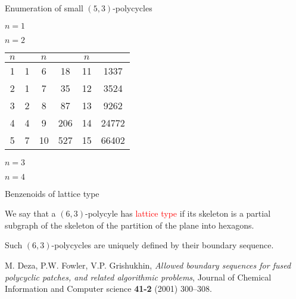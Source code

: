 \documentclass[%
pdf,
colorBG,
slideColor,
]{prosper}
\begin{document}
\begin{slide}{Enumeration of small $(5,3)$-polycycles}
\begin{center}
\begin{minipage}{58mm}
\centering
{}\par
$n=1$\\
\par
$n=2$\\[2mm]
{\scriptsize
\begin{tabular}{||c|c||c|c||c|c||}
\hline
$n$&     &$n$&        &$n$&\\
\hline
1  &1    &6  &18      &11 &1337\\
2  &1    &7  &35      &12 &3524\\
3  &2    &8  &87      &13 &9262\\
4  &4    &9  &206     &14 &24772\\
5  &7    &10 &527     &15 &66402\\
\hline
\end{tabular}
}
\end{minipage}
\begin{minipage}{45mm}
\centering
{}\par
$n=3$\\
\par
$n=4$\\
\end{minipage}
\end{center}


\end{slide}




\begin{slide}{Benzenoids of lattice type}

We say that a $(6,3)$-polycyle has \textcolor{red}{lattice type} if its skeleton is a partial subgraph of the skeleton of the partition of the plane into hexagons.
\begin{center}
\end{center}
Such $(6,3)$-polycycles are uniquely defined by their boundary sequence.

{\scriptsize
M. Deza, P.W. Fowler, V.P. Grishukhin, {\em Allowed boundary sequences for fused polycyclic patches, and related algorithmic problems}, Journal of Chemical Information and Computer science {\bf 41-2} (2001) 300--308.
}


\end{slide}
\end{document}
